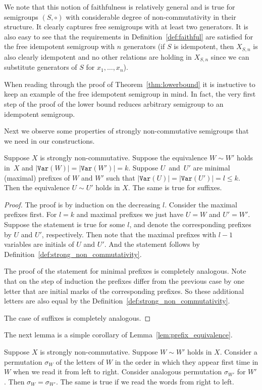 \documentclass{toc}
\newcommand{\var}{\texttt{Var}}
\begin{document}
We note that this notion of faithfulness is relatively general and is true for
semigroups $(S,\circ)$ with considerable degree of non-commutativity in their
structure. It clearly captures free semigroups with at least two generators. It
is also easy to see that the
requirements in Definition~\ref{def:faithful} are satisfied for the free
idempotent semigroup with $n$ generators (if $S$ is idempotent, then $X_{S,n}$
is also clearly idempotent and no other relations are holding in $X_{S,n}$ since
we can substitute generators of $S$ for $x_1, \ldots, x_n$).

When reading through the proof of Theorem~\ref{thm:lowerbound} it is instuctive to keep an example of the free idempotent semigroup in mind. In fact, the very first step of the proof of the lower bound reduces arbitrary semigroup to an idempotent semigroup.

Next we observe some properties of strongly non-commutative semigroups that we
need in our constructions.

\begin{lemma} \label{lem:prefix_equivalence}
Suppose $X$ is strongly non-commutative. Suppose the equivalence $W \sim W'$
holds in~$X$ and $|\var(W)|=|\var(W')|=k$. Suppose $U$~and~$U'$ are minimal
(maximal) prefixes of $W$ and $W'$ such that $|\var(U)| = |\var(U')| = l\leq k$.
Then the equivalence $U \sim U'$ holds in $X$. The same is true for suffixes.
\end{lemma}

\begin{proof}
The proof is by induction on the decreasing $l$. Consider the maximal prefixes
first. For $l=k$ and maximal prefixes we just have $U=W$ and $U'=W'$. Suppose
the statement is true for some $l$, and denote the corresponding prefixes by $U$
and $U'$, respectively. Then note that the maximal prefixes with $l-1$ variables
are initials of $U$ and $U'$. And the statement follows by
Definition~\ref{def:strong_non_commutativity}.

The proof of the statement for minimal prefixes is completely analogous. Note
that on the step of induction the prefixes differ from the previous case by one
letter that are initial marks of the corresponding prefixes. So these additional
letters are also equal by the Definition~\ref{def:strong_non_commutativity}. 

The case of suffixes is completely analogous.
\end{proof}

The next lemma is a simple corollary of Lemma~\ref{lem:prefix_equivalence}.
\begin{lemma} \label{lem:variables_order}

Suppose $X$ is strongly non-commutative. Suppose $W \sim W'$ holds in $X$. Consider a permutation $\sigma_W$ of the letters of $W$ in the order in which they appear first time in $W$ when we read it from left to right. Consider analogous permutation $\sigma_{W'}$ for $W'$. Then $\sigma_W = \sigma_{W'}$.
%
The same is true if we read the words from right to left.

\end{lemma}
\end{document}
